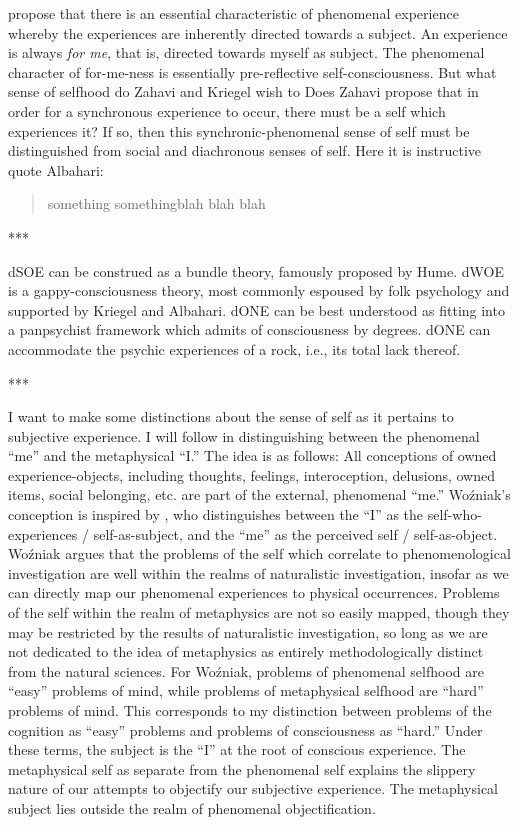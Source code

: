 \documentclass[leqno]{article}
\begin{document}
	\textcites{zahavi2015, zahavi2020} propose that there is an essential characteristic
	of phenomenal experience whereby the experiences are inherently directed towards
	a subject. An experience is always \emph{for me}, that is, directed towards myself
	as subject. The phenomenal character of for-me-ness is essentially pre-reflective
	self-consciousness. But what sense of selfhood do Zahavi and Kriegel wish to Does
	Zahavi propose that in order for a synchronous experience to occur, there must
	be a self which experiences it? If so, then this synchronic-phenomenal sense
	of self must be distinguished from social and diachronous senses of self. Here
	it is instructive quote Albahari: \blockquote[\cite{albahari2009}]{something somethingblah blah blah}

	***

	dSOE can be construed as a bundle theory, famously proposed by Hume. dWOE is a
	gappy-consciousness theory, most commonly espoused by folk psychology and supported
	by Kriegel and Albahari. dONE can be best understood as fitting into a
	panpsychist framework which admits of consciousness by degrees. dONE can accommodate
	the psychic experiences of a rock, i.e., its total lack thereof.

	***

	I want to make some distinctions about the sense of self as it pertains to subjective
	experience. I will follow \autocite{wozniak2018} in distinguishing between the
	phenomenal “me” and the metaphysical “I.” The idea is as follows: All
	conceptions of owned experience-objects, including thoughts, feelings, interoception,
	delusions, owned items, social belonging, etc. are part of the external, phenomenal
	“me.” Woźniak’s conception is inspired by \autocite{james1983}, who distinguishes
	between the “I” as the self-who-experiences / self-as-subject, and the “me” as
	the perceived self / self-as-object. Woźniak argues that the problems of the self
	which correlate to phenomenological investigation are well within the realms of
	naturalistic investigation, insofar as we can directly map our phenomenal
	experiences to physical occurrences. Problems of the self within the realm of metaphysics
	are not so easily mapped, though they may be restricted by the results of
	naturalistic investigation, so long as we are not dedicated to the idea of metaphysics
	as entirely methodologically distinct from the natural sciences. For Woźniak, problems
	of phenomenal selfhood are “easy” problems of mind, while problems of
	metaphysical selfhood are “hard” problems of mind. This corresponds to my distinction
	between problems of the cognition as “easy” problems and problems of consciousness
	as “hard.” Under these terms, the subject is the “I” at the root of conscious
	experience. The metaphysical self as separate from the phenomenal self explains
	the slippery nature of our attempts to objectify our subjective experience.
	The metaphysical subject lies outside the realm of phenomenal objectification.
\end{document}
